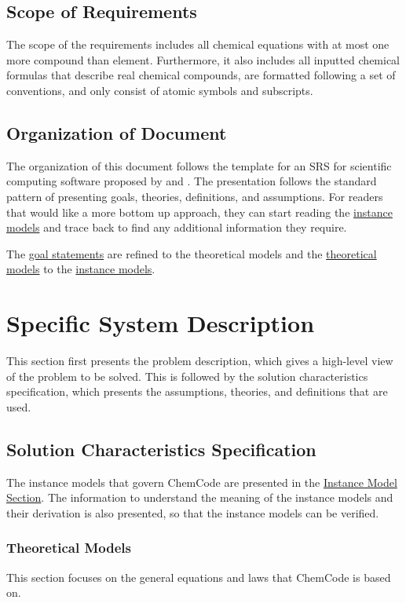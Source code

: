 \documentclass[12pt]{article}
\begin{document}
\subsection{Scope of Requirements}
\label{Sec:ReqsScope}
The scope of the requirements includes all chemical equations with at most one more compound than element. Furthermore, it also includes all inputted chemical formulas that describe real chemical compounds, are formatted following a set of conventions, and only consist of atomic symbols and subscripts.

\subsection{Organization of Document}
\label{Sec:DocOrg}
The organization of this document follows the template for an SRS for scientific computing software proposed by \cite{koothoor2013} and \cite{smithLai2005}. The presentation follows the standard pattern of presenting goals, theories, definitions, and assumptions. For readers that would like a more bottom up approach, they can start reading the \hyperref[Sec:IMs]{instance models} and trace back to find any additional information they require.

The \hyperref[Sec:GoalStmt]{goal statements} are refined to the theoretical models and the \hyperref[Sec:TMs]{theoretical models} to the \hyperref[Sec:IMs]{instance models}.

\section{Specific System Description}
\label{Sec:SpecSystDesc}
This section first presents the problem description, which gives a high-level view of the problem to be solved. This is followed by the solution characteristics specification, which presents the assumptions, theories, and definitions that are used.

\subsection{Solution Characteristics Specification}
\label{Sec:SolCharSpec}
The instance models that govern ChemCode are presented in the \hyperref[Sec:IMs]{Instance Model Section}. The information to understand the meaning of the instance models and their derivation is also presented, so that the instance models can be verified.

\subsubsection{Theoretical Models}
\label{Sec:TMs}
This section focuses on the general equations and laws that ChemCode is based on.
\end{document}
